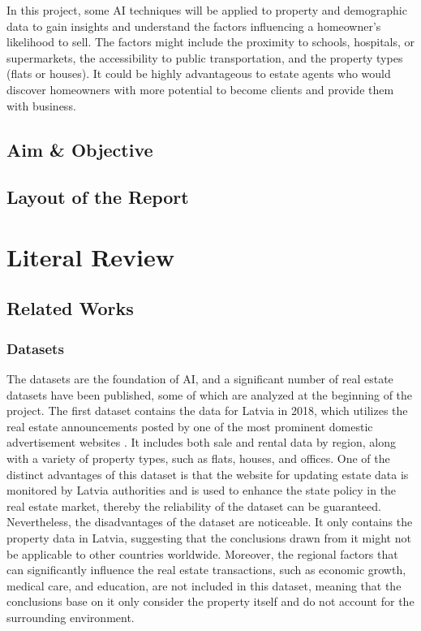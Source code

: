 \documentclass[12pt,twoside]{report}
\begin{document}
In this project, some AI techniques will be applied to property and demographic data to gain insights and understand the factors influencing a homeowner's likelihood to sell. The factors might include the proximity to schools, hospitals, or supermarkets, the accessibility to public transportation, and the property types (flats or houses). It could be highly advantageous to estate agents who would discover homeowners with more potential to become clients and provide them with business. 

\section{Aim \& Objective}
\section{Layout of the Report}

\chapter{Literal Review}
\section{Related Works}
\subsection{Datasets}
The datasets are the foundation of AI, and a significant number of real estate datasets have been published, some of which are analyzed at the beginning of the project. The first dataset contains the data for Latvia in 2018, which utilizes the real estate announcements posted by one of the most prominent domestic advertisement websites \citep{RN22}. It includes both sale and rental data by region, along with a variety of property types, such as flats, houses, and offices. One of the distinct advantages of this dataset is that the website for updating estate data is monitored by Latvia authorities and is used to enhance the state policy in the real estate market, thereby the reliability of the dataset can be guaranteed.
\\

Nevertheless, the disadvantages of the dataset are noticeable. It only contains the property data in Latvia, suggesting that the conclusions drawn from it might not be applicable to other countries worldwide. Moreover, the regional factors that can significantly influence the real estate transactions, such as economic growth, medical care, and education, are not included in this dataset, meaning that the conclusions base on it only consider the property itself and do not account for the surrounding environment. 
\\
\end{document}
